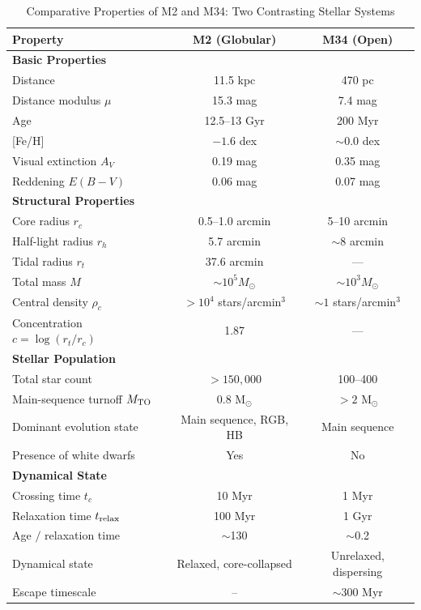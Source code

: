 \documentclass[linenumbers,trackchanges,twocolumn]{aastex701}
\begin{document}
\begin{table}[ht]
\centering
\caption{Comparative Properties of M2 and M34: Two Contrasting Stellar Systems}
\label{tab:cluster_properties}
\begin{tabular}{lcc}
\hline\hline
Property & M2 (Globular) & M34 (Open) \\
\hline
\multicolumn{3}{l}{\textbf{Basic Properties}} \\
Distance & 11.5 kpc & 470 pc \\
Distance modulus $\mu$ & 15.3 mag & 7.4 mag \\
Age & 12.5--13 Gyr & 200 Myr \\
{[Fe/H]} & $-1.6$ dex & $\sim 0.0$ dex \\
Visual extinction $A_V$ & 0.19 mag & 0.35 mag \\
Reddening $E(B-V)$ & 0.06 mag & 0.07 mag \\
\hline
\multicolumn{3}{l}{\textbf{Structural Properties}} \\
Core radius $r_c$ & 0.5--1.0 arcmin & 5--10 arcmin \\
Half-light radius $r_h$ & 5.7 arcmin & $\sim 8$ arcmin \\
Tidal radius $r_t$ & 37.6 arcmin & — \\
Total mass $M$ & $\sim 10^5 M_\odot$ & $\sim 10^3 M_\odot$ \\
Central density $\rho_c$ & $> 10^4$ stars/arcmin$^3$ & $\sim 1$ stars/arcmin$^3$ \\
Concentration $c = \log(r_t/r_c)$ & 1.87 & — \\
\hline
\multicolumn{3}{l}{\textbf{Stellar Population}} \\
Total star count & $> 150,000$ & 100--400 \\
Main-sequence turnoff $M_{\rm TO}$ & 0.8 M$_\odot$ & $> 2$ M$_\odot$ \\
Dominant evolution state & Main sequence, RGB, HB & Main sequence \\
Presence of white dwarfs & Yes & No \\
\hline
\multicolumn{3}{l}{\textbf{Dynamical State}} \\
Crossing time $t_c$ & 10 Myr & 1 Myr \\
Relaxation time $t_{\rm relax}$ & 100 Myr & 1 Gyr \\
Age $/$ relaxation time & $\sim$130 & $\sim$0.2 \\
Dynamical state & Relaxed, core-collapsed & Unrelaxed, dispersing \\
Escape timescale & -- & $\sim$300 Myr \\
\hline
\end{tabular}
\end{table}
\end{document}
